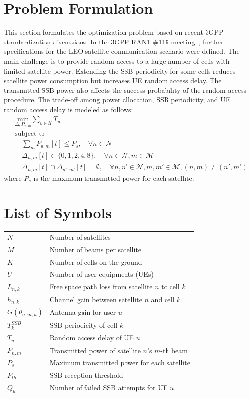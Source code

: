 \section{Problem Formulation}
This section formulates the optimization problem based on recent 3GPP standardization discussions. In the 3GPP RAN1 \#116 meeting~\cite{ran1-116}, further specifications for the LEO satellite communication scenario were defined. The main challenge is to provide random access to a large number of cells with limited satellite power. Extending the SSB periodicity for some cells reduces satellite power consumption but increases UE random access delay. The transmitted SSB power also affects the success probability of the random access procedure. The trade-off among power allocation, SSB periodicity, and UE random access delay is modeled as follows:
\begin{equation}
\begin{aligned}
    & \underset{\Delta, P_{n, m}}{\text{min}} \sum_{u \in \mathcal{U}} T_u \\
    & \text{subject to} \\
    & \quad \sum_{m} P_{n,m}[t] \leq P_s, \quad \forall n \in \mathcal{N} \\
    & \quad \Delta_{n, m}[t] \in \{0, 1, 2, 4, 8\}, \quad \forall n \in \mathcal{N}, m \in \mathcal{M} \\
    & \quad \Delta_{n, m}[t] \cap \Delta_{n', m'}[t] = \emptyset, \quad \forall n, n' \in \mathcal{N}, m, m' \in \mathcal{M}, (n, m) \neq (n', m')
\end{aligned}
\end{equation}
where $P_s$ is the maximum transmitted power for each satellite.

\section*{List of Symbols}
\begin{tabular}{ll}
$N$ & Number of satellites \\
$M$ & Number of beams per satellite \\
$K$ & Number of cells on the ground \\
$U$ & Number of user equipments (UEs) \\
$L_{n,k}$ & Free space path loss from satellite $n$ to cell $k$ \\
$h_{n,k}$ & Channel gain between satellite $n$ and cell $k$ \\
$G(\theta_{n,m,u})$ & Antenna gain for user $u$ \\
$T^{SSB}_k$ & SSB periodicity of cell $k$ \\
$T_u$ & Random access delay of UE $u$ \\
$P_{n,m}$ & Transmitted power of satellite $n$'s $m$-th beam \\
$P_s$ & Maximum transmitted power for each satellite \\
$P_{th}$ & SSB reception threshold \\
$Q_u$ & Number of failed SSB attempts for UE $u$ \\
\end{tabular}
